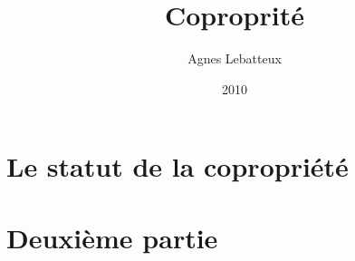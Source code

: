 \documentclass[10pt,a4paper,twoside]{book}
\author{Agnes Lebatteux}
\title{Coproprité}
\date{2010}
\begin{document}
	\maketitle
	
	
	
	\part{Le statut de la copropriété}
	
		
	
	\part{Deuxième partie}
	
	\tableofcontents
	
\end{document}
